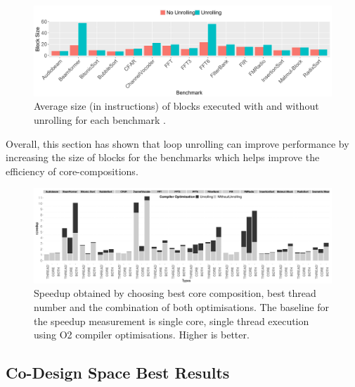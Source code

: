 \begin{figure}[t]
  \includegraphics[width=1\textwidth]{streamit-paper/graphics/unrolling_size.pdf}
  \caption{Average size (in instructions) of blocks executed with and without unrolling for each benchmark .}\label{fig:unroll_size}
\end{figure}

Overall, this section has shown that loop unrolling can improve performance by increasing the size of blocks for the benchmarks which helps improve the efficiency of core-compositions.

\begin{figure}[t]%
    \includegraphics[width=1\linewidth,keepaspectratio]{streamit-paper/graphics/threadcompbench.pdf}
    \caption{Speedup obtained by choosing best core composition, best
      thread number and the combination of both optimisations. The baseline for the speedup measurement is single core, single thread execution using O2 compiler optimisations. Higher
      is better.}\label{fig:overviewhist}
\end{figure}
\subsection{Co-Design Space Best Results}


